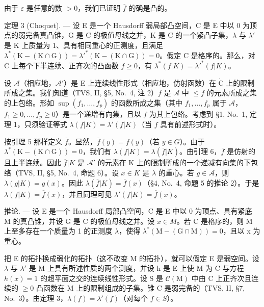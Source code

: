 由于 \(\varepsilon\) 是任意的数 \(>0\)，我们已证明 \(\overline{f}\) 的确是凸的。

定理 3 (Choquet). --- 设 E 是一个 Hausdorff 弱局部凸空间，C 是 E 中以 0 为顶点的弱完备真凸锥，G 是 C 的极值母线之并，K 是 C 的一个紧凸子集，\(\lambda\) 与 \(\lambda'\) 是 K 上质量为 1、具有相同重心的正测度，且满足 \(\lambda^{*}(\mathrm{K} - (\mathrm{K} \cap \mathrm{G})) = \lambda'^{*}(\mathrm{K} - (\mathrm{K} \cap \mathrm{G})) = 0\)。假定 C 是格序的。那么，对 C 上每个下半连续、正齐次的凸函数 \(f \geqslant 0\)，有 \(\lambda^{*}(f|K) = \lambda'^{*}(f|K)\)。

设 \(\mathcal{A}\)（相应地，\(\mathcal{A}'\)）是 E 上连续线性形式（相应地，仿射函数）在 \(\dot{\mathrm{C}}\) 上的限制所成之集。我们知道（TVS, II, §5, No.~4, 注 2）\(f\) 是 \(\mathcal{A}\) 中 \(\leqslant f\) 的元素所成之集的上包络。形如 \(\sup(f_1, \ldots, f_p)\) 的函数所成之集（其中 \(f_1, \ldots, f_p\) 属于 \(\mathscr{A}\)，\(f_1 \geqslant 0, \ldots, f_p \geqslant 0\)）是一个递增有向集，且以 \(f\) 为其上包络。考虑到 §1, No.~1, 定理 1，只须验证等式 \(\lambda(f|K) = \lambda'(f|K)\)（当 \(f\) 具有前述形式时）。

按引理 5 那样定义 \(\overline{f}\)。显然，\(\overline{f}(y) = f(y)\)（若 \(y \in G\)）。由于 \(\lambda^{*}(\mathrm{K} - (\mathrm{K} \cap \mathrm{G})) = 0\)，我们有 \(\lambda(f|K) = \lambda(\overline{f}|K)\)。由引理 6，\(\overline{f}\) 是仿射的且上半连续。因此 \(\overline{f}|K\) 是 \(\mathcal{A}'\) 的元素在 K 上的限制所成的一个递减有向集的下包络（TVS, II, §5, No.~4, 命题 6）。设 \(x \in K\) 是 \(\lambda\) 的重心。若 \(g \in \mathcal{A}\)，则 \(\lambda(g|K) = g(x)\)。因此 \(\lambda(\overline{f}|K) = \overline{f}(x)\)（§4, No.~4, 命题 5 的推论 2）。于是 \(\lambda(f|K) = \overline{f}(x)\)，并且同理可见 \(\lambda'(f|K) = \overline{f}(x)\)。

推论. --- 设 E 是一个 Hausdorff 局部凸空间，C 是 E 中以 0 为顶点、具有紧底 M 的真凸锥，并设 G 是 C 的极值母线之并。设 \(x \in M\)。若 C 是格序的，则 M 上至多存在一个质量为 1 的正测度 \(\lambda\)，使得 \(\lambda^{*}(\mathrm{M} - (\mathrm{G} \cap \mathrm{M})) = 0\)，且以 x 为重心。

把 E 的拓扑换成弱化的拓扑（这不改变 M 的拓扑），就可以假定 E 是弱空间。设 \(\lambda\) 与 \(\lambda'\) 是 M 上具有所述性质的两个测度，并设 h 是 E 上使 M 为 C 与方程 \(h(x)=1\) 的超平面之交的连续线性形式。设 S 是 \(\mathcal{C}(\mathrm{M})\) 中由 C 上正齐次且连续的 \(\geqslant0\) 凸函数在 M 上的限制组成的子集。锥 C 是弱完备的（TVS, II, §7, No.~3）。由定理 3，\(\lambda(f)=\lambda'(f)\)（对每个 \(f\in S\)）。

